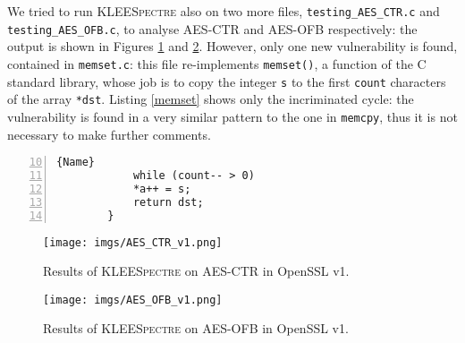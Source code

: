 \documentclass[target=mst,aauheader=aics]{thud}
\theoremstyle{definition}
\begin{document}
	We tried to run \textsc{KLEESpectre} also on two more files, \texttt{testing\_AES\_CTR.c} and \texttt{testing\_AES\_OFB.c}, to analyse AES-CTR and AES-OFB respectively: the output is shown in Figures \ref{fig:result_ctr_v1} and \ref{fig:result_ofb_v1}. However, only one new vulnerability is found, contained in \texttt{memset.c}: this file re-implements \texttt{memset()}, a function of the C standard library, whose job is to copy the integer \texttt{s} to the first \texttt{count} characters of the array \texttt{*dst}. Listing \ref{memset} shows only the incriminated cycle: the vulnerability is found in a very similar pattern to the one in \texttt{memcpy}, thus it is not necessary to make further comments.
	
	\begin{minipage}{.4\textwidth}
		\begin{lstlisting}[caption=\texttt{memcpy.c}, firstnumber=10, label=memset, numbers=left]{Name}
			while (count-- > 0)
			*a++ = s;
			return dst;
		}
	\end{lstlisting}
\end{minipage}
\vspace{3mm}

\begin{figure}[h]
	\centering
	\texttt{[image: imgs/AES\_CTR\_v1.png]}
	\captionsetup{width=.8\linewidth}
	\caption{Results of \textsc{KLEESpectre} on AES-CTR in OpenSSL v1.}
	\label{fig:result_ctr_v1} 
\end{figure}

\begin{figure}[h]
	\centering
	\texttt{[image: imgs/AES\_OFB\_v1.png]}
	\captionsetup{width=.8\linewidth}
	\caption{Results of \textsc{KLEESpectre} on AES-OFB in OpenSSL v1.}
	\label{fig:result_ofb_v1}
\end{figure}
\end{document}
